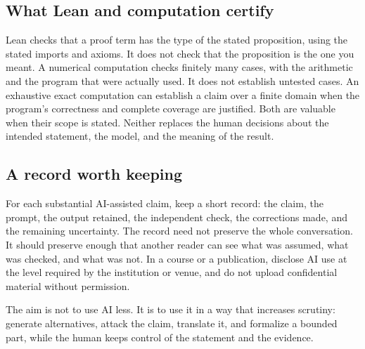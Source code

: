\subsection*{What Lean and computation certify}
Lean checks that a proof term has the type of the stated proposition, using the stated imports and axioms. It does not check that the proposition is the one you meant. A numerical computation checks finitely many cases, with the arithmetic and the program that were actually used. It does not establish untested cases. An exhaustive exact computation can establish a claim over a finite domain when the program's correctness and complete coverage are justified. Both are valuable when their scope is stated. Neither replaces the human decisions about the intended statement, the model, and the meaning of the result.

\subsection*{A record worth keeping}
For each substantial AI-assisted claim, keep a short record: the claim, the prompt, the output retained, the independent check, the corrections made, and the remaining uncertainty. The record need not preserve the whole conversation. It should preserve enough that another reader can see what was assumed, what was checked, and what was not. In a course or a publication, disclose AI use at the level required by the institution or venue, and do not upload confidential material without permission.

The aim is not to use AI less. It is to use it in a way that increases scrutiny: generate alternatives, attack the claim, translate it, and formalize a bounded part, while the human keeps control of the statement and the evidence.
